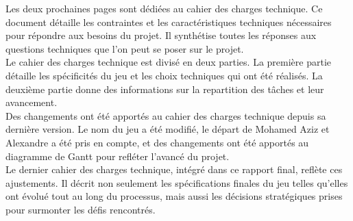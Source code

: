 

Les deux prochaines pages sont dédiées au cahier des charges technique.
Ce document détaille les contraintes et les caractéristiques techniques nécessaires pour répondre aux besoins du projet.
Il synthétise toutes les réponses aux questions techniques que l'on peut se poser sur le projet.
\\

Le cahier des charges technique est divisé en deux parties.
La première partie détaille les spécificités du jeu et les choix techniques qui ont été réalisés. 
La deuxième partie donne des informations sur la repartition des tâches et leur avancement.
\\

Des changements ont été apportés au cahier des charges technique depuis sa dernière version.
Le nom du jeu a été modifié, le départ de Mohamed Aziz et Alexandre a été pris en compte, et des changements ont été apportés au diagramme de Gantt pour refléter l'avancé du projet.
\\

Le dernier cahier des charges technique, intégré dans ce rapport final, reflète ces ajustements. Il décrit non seulement 
les spécifications finales du jeu telles qu'elles ont évolué tout au long du processus, mais aussi les décisions stratégiques prises pour surmonter les défis rencontrés.






